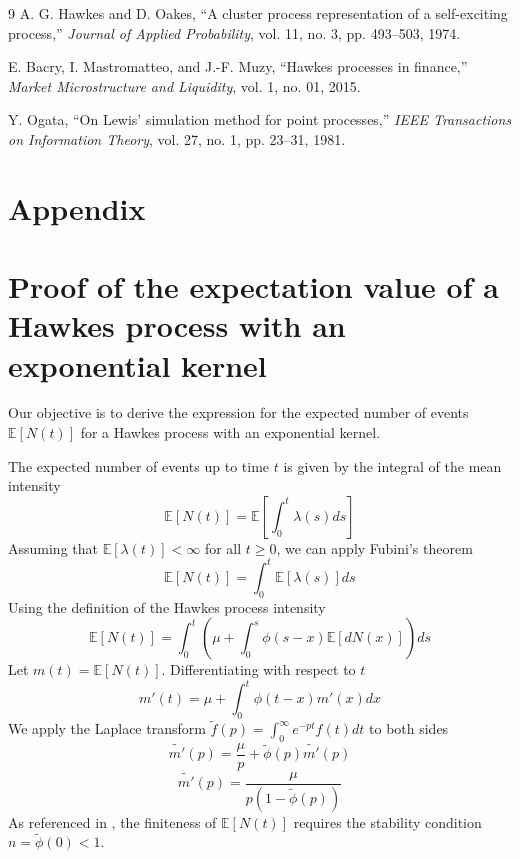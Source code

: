 \documentclass[a4paper,11pt]{article}
\begin{document}
\begin{thebibliography}{9}
A. G. Hawkes and D. Oakes, ``A cluster process representation of a self-exciting process,'' \textit{Journal of Applied Probability}, vol. 11, no. 3, pp. 493--503, 1974.

E. Bacry, I. Mastromatteo, and J.-F. Muzy, ``Hawkes processes in finance,'' \textit{Market Microstructure and Liquidity}, vol. 1, no. 01, 2015.

Y. Ogata, ``On Lewis' simulation method for point processes,'' \textit{IEEE Transactions on Information Theory}, vol. 27, no. 1, pp. 23--31, 1981.
\end{thebibliography}


\clearpage
\appendix

\section*{Appendix} 

\section{Proof of the expectation value of a Hawkes process with an exponential kernel}

Our objective is to derive the expression for the expected number of events $\mathbb{E}[N(t)]$ for a Hawkes process with an exponential kernel.

The expected number of events up to time $t$ is given by the integral of the mean intensity
$$     \mathbb{E}[N(t)] = \mathbb{E}\left[ \int_0^t \lambda(s) ds \right]
$$ 
Assuming that $\mathbb{E}[\lambda(t)] < \infty$ for all $t \ge 0$, we can apply Fubini's theorem
$$ 
\mathbb{E}[N(t)] = \int_0^t \mathbb{E}[\lambda(s)] ds
$$ 
Using the definition of the Hawkes process intensity
$$     \mathbb{E}[N(t)] = \int_0^t \left( \mu + \int_0^s \phi(s - x) \mathbb{E}[dN(x)] \right) ds
$$ 
Let $m(t) = \mathbb{E}[N(t)]$. Differentiating with respect to $t$
$$     m'(t) = \mu + \int_0^t \phi(t - x) m'(x) dx
$$ 
We apply the Laplace transform $\tilde{f}(p) = \int_0^\infty e^{-pt} f(t) dt$ to both sides
$$    \tilde{m'}(p) = \frac{\mu}{p} + \tilde{\phi}(p) \tilde{m'}(p)
$$
$$     \tilde{m'}(p) = \frac{\mu}{p(1 - \tilde{\phi}(p))}
$$ 
As referenced in \cite{bacry2015}, the finiteness of $\mathbb{E}[N(t)]$ requires the stability condition $n  = \tilde{\phi}(0) < 1$.
\end{document}
